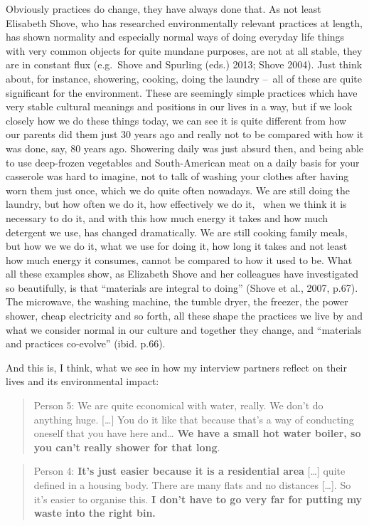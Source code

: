 ﻿\documentclass[a4paper,
fontsize=11pt,
oneside,
numbers=noperiodatend,
parskip=half-,
bibliography=totoc,
final
]{scrartcl}
\begin{document}
Obviously practices do change, they have always done that. As not least
Elisabeth Shove, who has researched environmentally relevant practices
at length, has shown normality and especially normal ways of doing
everyday life things with very common objects for quite mundane
purposes, are not at all stable, they are in constant flux (e.g.~Shove
and Spurling (eds.) 2013; Shove 2004). Just think about, for instance,
showering, cooking, doing the laundry --~all of these are quite
significant for the environment. These are seemingly simple practices
which have very stable cultural meanings and positions in our lives in a
way, but if we look closely how we do these things today, we can see it
is quite different from how our parents did them just 30 years ago and
really not to be compared with how it was done, say, 80 years ago.
Showering daily was just absurd then, and being able to use deep-frozen
vegetables and South-American meat on a daily basis for your casserole
was hard to imagine, not to talk of washing your clothes after having
worn them just once, which we do quite often nowadays. We are still
doing the laundry, but how often we do it, how effectively we do it,~
when we think it is necessary to do it, and with this how much energy it
takes and how much detergent we use, has changed dramatically. We are
still cooking family meals, but how we we do it, what we use for doing
it, how long it takes and not least how much energy it consumes, cannot
be compared to how it used to be. What all these examples show, as
Elizabeth Shove and her colleagues have investigated so beautifully, is
that \enquote{materials are integral to doing} (Shove et al., 2007,
p.67). The microwave, the washing machine, the tumble dryer, the
freezer, the power shower, cheap electricity and so forth, all these
shape the practices we live by and what we consider normal in our
culture and together they change, and \enquote{materials and practices
co-evolve} (ibid. p.66).

And this is, I think, what we see in how my interview partners reflect
on their lives and its environmental impact:

\begin{quote}
Person 5: We are quite economical with water, really. We don't do
anything huge. {[}\ldots{}{]} You do it like that because that's a way
of conducting oneself that you have here and\ldots{} \textbf{We have a
small hot water boiler, so you can't really shower for that long}.~
\end{quote}

\begin{quote}
Person 4: \textbf{It's just easier because it is a residential area}
{[}\ldots{}{]} quite defined in a housing body. There are many flats and
no distances {[}\ldots{}{]}. So it's easier to organise this. \textbf{I
don't have to go very far for putting my waste into the right bin.}
\end{quote}
\end{document}
